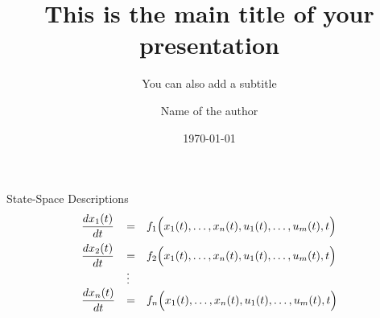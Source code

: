 \documentclass[pdf,blueBG,slideColor]{tudprosper}
\title{This is the main title of your presentation}
\author{Name of the author}
\subtitle{You can also add a subtitle}
\date{\today}
\begin{document}
\maketitle




\begin{slide}[Dissolve]{State-Space Descriptions}
\[  \begin{array}{lll}
    \displaystyle\frac{dx_1(t)}{dt} &=& f_1\Bigl(x_1(t),\ldots,x_n(t),u_1(t),\ldots,u_m(t),t\Bigr) \\[2ex]
    \displaystyle\frac{dx_2(t)}{dt} &=& f_2\Bigl(x_1(t),\ldots,x_n(t),u_1(t),\ldots,u_m(t),t\Bigr) \\
             &\vdots&                                           \\
    \displaystyle\frac{dx_n(t)}{dt} &=& f_n\Bigl(x_1(t),\ldots,x_n(t),u_1(t),\ldots,u_m(t),t\Bigr)
  \end{array}\]
\end{slide}

\end{document}
